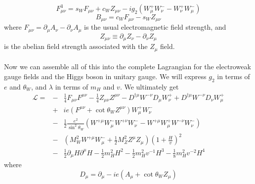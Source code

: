 \documentclass[cyan]{elegantnote}
\begin{document}
\[F^3_{\mu\nu} = s_WF_{\mu\nu} + c_W Z_{\mu\nu} -ig_2(W_{\mu}^+ W_{\nu}^- - W_{\nu}^+ W_{\mu}^-)\]
\[B_{\mu\nu} = c_WF_{\mu\nu} - s_W Z_{\mu\nu}\]
where $F_{\mu\nu} = \partial_{\mu}A_{\nu} - \partial_{\nu}A_{\mu}$ is the usual electromagnetic field strength, and
\[Z_{\mu\nu} \equiv \partial_{\mu}Z_{\nu} - \partial_{\nu}Z_{\mu}\]
is the abelian field strength associated with the $Z_{\mu}$ field.
\\ \\
Now we can assemble all of this into the complete Lagrangian for the electroweak gauge fields and the Higgs boson in unitary gauge. We will express $g_2$ in terms of $e$ and $\theta_W$, and $\lambda$ in terms of $m_H$ and
$v$. We ultimately get
\begin{eqnarray}
\mathcal{L} = &-& \frac{1}{4} F_{\mu\nu}F^{\mu\nu} - \frac{1}{4} Z_{\mu\nu}Z^{\mu\nu} - D^{\dagger\mu}W^{-\nu}D_{\mu}W^{+}_{\nu} + D^{\dagger\mu}W^{-\nu}D_{\nu}W^{+}_{\mu} \nonumber \\
&+& ie(F^{\mu\nu} + \cot\theta_W Z^{\mu\nu})W_{\mu}^+ W_{\nu}^- \nonumber \\
&-& \frac{1}{2} \frac{e^2}{\sin^2\theta_W} (W^{+\mu}W_{\mu}^{-}W^{+\nu}W_{\nu}^{-} -W^{+\mu}W_{\mu}^{+}W^{-\nu}W_{\nu}^{-} ) \nonumber \\
&-& (M_W^2 W^{+\mu} W^{-}_{\mu} + \frac{1}{2}M_Z^2 Z^{\mu}Z_{\mu})(1 + \frac{H}{v})^2 \nonumber \\
&-& \frac{1}{2}\partial_{\mu}H \partial^{\mu}H  - \frac{1}{2}m_H^2 H^2  - \frac{1}{2}m_H^2 v^{-1} H^3 -  \frac{1}{8}m_H^2 v^{-2}H^4 \nonumber
\end{eqnarray}
where
\[D_{\mu} = \partial_{\mu} -ie(A_{\mu} + \cot\theta_WZ_{\mu})\]
\end{document}
